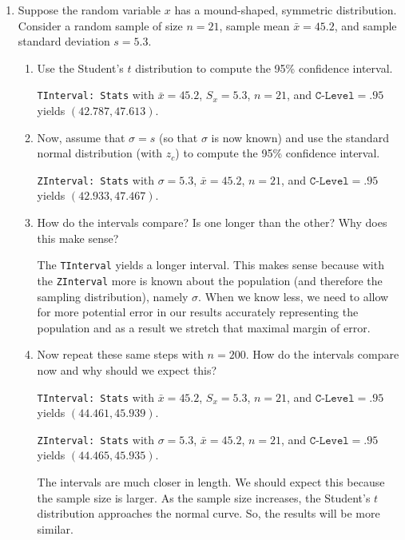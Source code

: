 \begin{enumerate}


\item Suppose the random variable $x$ has a mound-shaped, symmetric distribution.  Consider a random sample of size $n=21$, sample mean $\bar x = 45.2$, and sample standard deviation $s = 5.3$.
	\begin{enumerate}
	\item Use the Student's $t$ distribution to compute the 95\% confidence interval. 
	
	{\answer \texttt{TInterval: Stats} 
	with $\bar{x} = 45.2$, $S_x = 5.3$, $n=21$, and $\texttt{C-Level} = .95$ yields $(42.787, 47.613)$.
	} 
	
	\item Now, assume that $\sigma = s$ (so that $\sigma$ is now known) and use the standard normal distribution (with $z_c$) to compute the 95\% confidence interval. 
	
	{\answer \texttt{ZInterval: Stats} 
	with $\sigma = 5.3$, $\bar{x} = 45.2$, $n=21$, and $\texttt{C-Level} = .95$ yields $(42.933, 47.467)$.
	} 
	
	\item How do the intervals compare?  Is one longer than the other?  Why does this make sense? 
	
	{\answer The \texttt{TInterval} yields a longer interval.  This makes sense because with the \texttt{ZInterval} more is known about the population (and therefore the sampling distribution), namely $\sigma$.  When we know less, we need to allow for more potential error in our results accurately representing the population and as a result we stretch that maximal margin of error.
	} 
	
	\item Now repeat these same steps with $n=200$.  How do the intervals compare now and why should we expect this? 
	
	{\answer \texttt{TInterval: Stats} 
	with $\bar{x} = 45.2$, $S_x = 5.3$, $n=21$, and $\texttt{C-Level} = .95$ yields $(44.461, 45.939)$.
	
	\texttt{ZInterval: Stats} 
	with $\sigma = 5.3$, $\bar{x} = 45.2$, $n=21$, and $\texttt{C-Level} = .95$ yields $(44.465, 45.935)$.
	
	The intervals are much closer in length.  We should expect this because the sample size is larger.  As the sample size increases, the Student's $t$ distribution approaches the normal curve.  So, the results will be more similar.
	} 
	\end{enumerate}


\end{enumerate}
